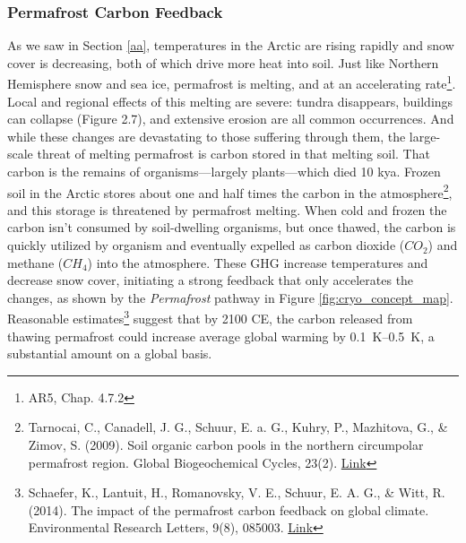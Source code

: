 \documentclass[amstex,12pt]{book}
\begin{document}
\subsubsection{Permafrost Carbon Feedback} As we saw in Section \ref{aa}, temperatures in the Arctic are rising rapidly and snow cover is decreasing, both of which drive more heat into soil. Just like Northern Hemisphere snow and sea ice, permafrost is melting, and at an accelerating rate\footnote{AR5, Chap. 4.7.2}. Local and regional effects of this melting are severe: tundra disappears, buildings can collapse (Figure 2.7), and extensive erosion are all common occurrences. And while these changes are devastating to those suffering through them, the large-scale threat of melting permafrost is carbon stored in that melting soil. That carbon is the remains of organisms---largely plants---which died 10 kya. Frozen soil in the Arctic stores about one and half times the carbon in the atmosphere\footnote{Tarnocai, C., Canadell, J. G., Schuur, E. a. G., Kuhry, P., Mazhitova, G., \& Zimov, S. (2009). Soil organic carbon pools in the northern circumpolar permafrost region. Global Biogeochemical Cycles, 23(2). \href{https://doi.org/10.1029/2008GB003327}{Link}}, and this storage is threatened by permafrost melting. When cold and frozen the carbon isn't consumed by soil-dwelling organisms, but once thawed, the carbon is quickly utilized by organism and eventually expelled as carbon dioxide ($CO_2$) and methane ($CH_4$) into the atmosphere. These GHG increase temperatures and decrease snow cover, initiating a strong feedback that only accelerates the changes, as shown by the \textit{Permafrost} pathway in Figure \ref{fig:cryo_concept_map}. Reasonable estimates\footnote{Schaefer, K., Lantuit, H., Romanovsky, V. E., Schuur, E. A. G., \& Witt, R. (2014). The impact of the permafrost carbon feedback on global climate. Environmental Research Letters, 9(8), 085003. \href{https://doi.org/10.1088/1748-9326/9/8/085003}{Link}} suggest that by 2100 CE, the carbon released from thawing permafrost could increase average global warming by \SIrange{0.1}{0.5}{\kelvin}, a substantial amount on a global basis.\\
 
\end{document}
